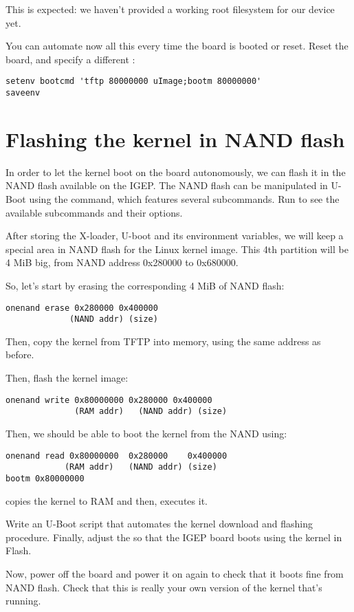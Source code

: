 This is expected: we haven't provided a working root filesystem for
our device yet.

You can automate now all this every time the board is booted or
reset. Reset the board, and specify a different :

\begin{verbatim}
setenv bootcmd 'tftp 80000000 uImage;bootm 80000000'
saveenv
\end{verbatim}

\section{Flashing the kernel in NAND flash}

In order to let the kernel boot on the board autonomously, we can
flash it in the NAND flash available on the IGEP. The NAND flash can
be manipulated in U-Boot using the  command, which
features several subcommands. Run  to see the
available subcommands and their options.

After storing the X-loader, U-boot and its environment variables, we
will keep a special area in NAND flash for the Linux kernel image.
This 4th partition will be 4 MiB big, from NAND address
0x280000 to 0x680000.

So, let's start by erasing the corresponding 4 MiB of NAND flash:

\begin{verbatim}
onenand erase 0x280000 0x400000
             (NAND addr) (size)
\end{verbatim}

Then, copy the kernel from TFTP into memory, using the same address as
before.

Then, flash the kernel image:

\begin{verbatim}
onenand write 0x80000000 0x280000 0x400000
              (RAM addr)   (NAND addr) (size)
\end{verbatim}

Then, we should be able to boot the kernel from the NAND using:

\begin{verbatim}
onenand read 0x80000000  0x280000    0x400000
            (RAM addr)   (NAND addr) (size)
bootm 0x80000000
\end{verbatim}

 copies the kernel to RAM and then, 
executes it.

Write an U-Boot script that automates the kernel download and flashing
procedure. Finally, adjust the  so that the IGEP board
boots using the kernel in Flash.

Now, power off the board and power it on again to check that it boots
fine from NAND flash. Check that this is really your own version of
the kernel that's running.
